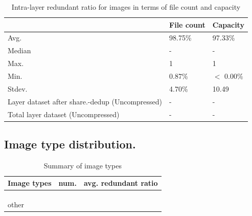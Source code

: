 \begin{table} 
	\centering 
	\scriptsize  
	\caption{Intra-layer redundant ratio for images in terms of file count and capacity} \label{tbl:across_ratio_layers} 
	\begin{tabular}{|l|l|l|}%
		\hline 
		& File count & Capacity \\
		\hline
		Avg. & 98.75\% & 97.33\%\\
		\hline
		Median & - & - \\
		\hline
		Max. & 1 & 1\\
		\hline
		Min.  & 0.87\%  & $<$ 0.00\%\\
		\hline
		Stdev.  &  4.70\% & 10.49\\
		\hline
		Layer dataset after share.-dedup (Uncompressed) & -  & -\\
		\hline 
		Total layer dataset (Uncompressed) &  -	& -\\
		\hline
	\end{tabular} 
\end{table}


\subsection{Image type distribution.}

\begin{table} 
	\centering 
	\scriptsize  
	\caption{Summary of image types} \label{tbl:redundant_ratio} 
	\begin{tabular}{|l|l|l|}%
		\hline 
		Image types & num. & avg. redundant ratio  \\
		\hline
		  &   &        \\
		\hline
		  &   &         \\
		\hline
		   &   &       \\
		   \hline
		other     &   &       \\
		\hline
	\end{tabular} 
\end{table} 

